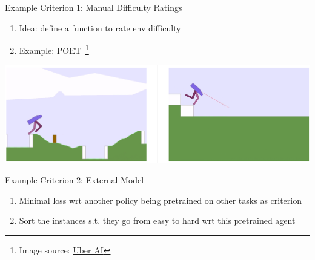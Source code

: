 \documentclass[aspectratio=169]{../latex_main/tntbeamer}  %
\begin{document}
\begin{frame}[c]{Example Criterion 1: Manual Difficulty Ratings}
	
	\begin{enumerate}
		\item Idea: define a function to rate env difficulty
		\item Example: POET~\footnote{Image source: \href{https://eng.uber.com/poet-open-ended-deep-learning/}{Uber AI}}
	\end{enumerate}
	\centering
	
	\includegraphics[scale=0.5]{images/poet.PNG}			
\end{frame}

\begin{frame}[c]{Example Criterion 2: External Model}
	
	\begin{enumerate}
		\item Minimal loss wrt another policy being pretrained on other tasks as criterion
		\item Sort the instances s.t. they go from easy to hard wrt this pretrained agent~
	\end{enumerate}
	
\end{frame}

\end{document}
